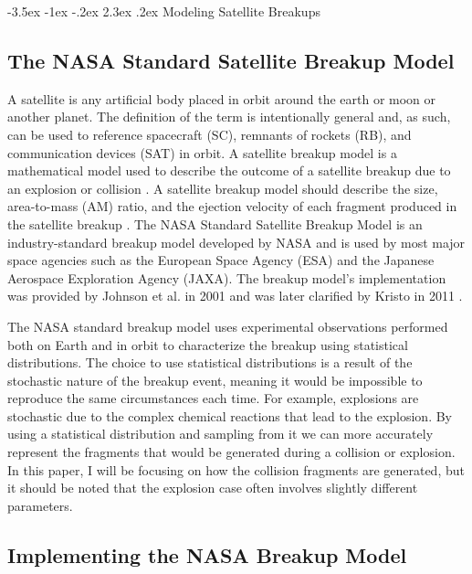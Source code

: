 \documentclass[a4paper, 12pt]{article}
\makeatletter
\renewcommand\section{\clearpage\newpage\@startsection {section}{1}{\z@}%
	{-3.5ex \@plus -1ex \@minus -.2ex}%
	{2.3ex \@plus.2ex}%
	{\normalfont\Large\bfseries}}
\makeatother
\begin{document}
\section{Modeling Satellite Breakups}
\label{Modeling Satellite Breakups}
\doublespace


\subsection{The NASA Standard Satellite Breakup Model}

A satellite is any artificial body placed in orbit around the earth or moon or another planet. The definition of the term is intentionally general and, as such, can be used to reference spacecraft (SC), remnants of rockets (RB), and communication devices (SAT) in orbit.  A satellite breakup model is a mathematical model used to describe the outcome of a satellite breakup due to an explosion or collision \citep{jer_chyi_liou_orbital_nodate}.  A satellite breakup model should describe the size, area-to-mass (AM) ratio, and the ejection velocity of each fragment produced in the satellite breakup \citep{johnson_nasas_2001}. The NASA Standard Satellite Breakup Model is an industry-standard breakup model developed by NASA and is used by most major space agencies such as the European Space Agency (ESA) and the Japanese Aerospace Exploration Agency (JAXA). The breakup model's implementation was provided by Johnson et al. in 2001 \cite{johnson_nasas_2001} and was later clarified by Kristo in 2011 \citep{krisko_proper_2011}. 

The NASA standard breakup model uses experimental observations performed both on Earth and in orbit to characterize the breakup using statistical distributions. The choice to use statistical distributions is a result of the stochastic nature of the breakup event, meaning it would be impossible to reproduce the same circumstances each time. For example, explosions are stochastic due to the complex chemical reactions that lead to the explosion.  By using a statistical distribution and sampling from it we can more accurately represent the fragments that would be generated during a collision or explosion. In this paper, I will be focusing on how the collision fragments are generated, but it should be noted that the explosion case often involves slightly different parameters.

\subsection{Implementing the NASA Breakup Model}
\end{document}
